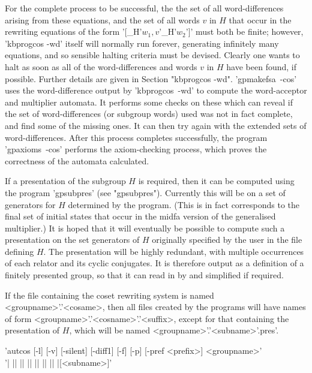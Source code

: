 For the complete process to be successful, the
the set of all word-differences arising from these equations,
and the set of all words $v$ in $H$ that occur in the rewriting equations of
the form '[\_H'$w_1,v$'\_H'$w_2$']' must both be finite;
however, 'kbprogcos -wd' itself will normally run forever, generating
infinitely many equations, and so sensible halting criteria must be devised.
Clearly one wants to halt as soon as all of the
word-differences and words $v$ in $H$ have been found, if possible. Further
details are given in Section "kbprogcos -wd". 'gpmakefsa\ -cos' uses the
word-difference output by 'kbprogcos\ -wd' to compute the word-acceptor and
multiplier automata.
It performs some checks on these which can reveal if the set of
word-differences (or subgroup words) used was not in fact complete, and find
some of the missing ones. It can then try again with the extended sets of
word-differences. After this process completes successfully, the program
'gpaxioms\ -cos' performs the axiom-checking process, which proves the
correctness of the automata calculated.

If a presentation of the subgroup $H$ is required, then it can be computed
using the program 'gpsubpres' (see "gpsubpres"). Currently this will be on
a set of generators for $H$ determined by the program. (This is in fact
corresponds to the final set of initial states that occur in the midfa version
of the generalised multiplier.) It is hoped that it
will eventually be possible to compute such a presentation on the set
generators of $H$ originally specified by the user in the file defining $H$.
The presentation will be highly redundant, with multiple occurrences of each
relator and its cyclic conjugates. It is therefore output as a {\GAP}
definition of a finitely presented group, so that it can read in by {\GAP}
and simplified if required.

If the file containing the coset rewriting system is named
<groupname>'.'<cosame>, then all files created by the programs will have names
of form <groupname>'.'<cosname>'.'<suffix>, except for that containing the
presentation of $H$, which will be named <groupname>'.'<subname>'.pres'.


'autcos  [-l] [-v] [-silent] [-diff1] [-f] [-p] [-pref <prefix>] <groupname>'\\
'| || || || || || || |[<subname>]'

